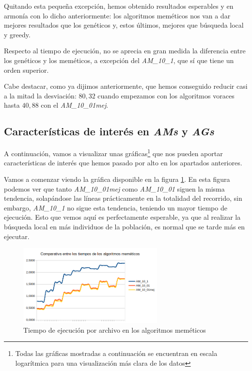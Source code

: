Quitando esta pequeña excepción, hemos obtenido resultados esperables y en armonía con lo dicho anteriormente: los algoritmos meméticos nos van a dar mejores resultados que los genéticos y, estos últimos, mejores que búsqueda local y greedy.

Respecto al tiempo de ejecución, no se aprecia en gran medida la diferencia entre los genéticos y los meméticos, a excepción del \textit{AM\_10\_1}, que sí que tiene un orden superior.

Cabe destacar, como ya dijimos anteriormente, que hemos conseguido reducir casi a la mitad la desviación: $80,32$ cuando empezamos con los algoritmos voraces hasta $40,88$ con el \textit{AM\_10\_01mej}.

\subsection{Características de interés en \textit{AMs} y \textit{AGs}}

A continuación, vamos a visualizar unas gráficas\footnote{Todas las gráficas mostradas a continuación se encuentran en escala logarítmica para una visualización más clara de los datos} que nos pueden aportar características de interés que hemos pasado por alto en los apartados anteriores.

Vamos a comenzar viendo la gráfica disponible en la figura \ref{fig:tmemeticos}. En esta figura podemos ver que tanto \textit{AM\_10\_01mej} como \textit{AM\_10\_01} siguen la misma tendencia, solapándose las líneas prácticamente en la totalidad del recorrido, sin embargo, \textit{AM\_10\_1} no sigue esta tendencia, teniendo un mayor tiempo de ejecución. Esto que vemos aquí es perfectamente esperable, ya que al realizar la búsqueda local en más individuos de la población, es normal que se tarde más en ejecutar.

\begin{figure}[H]
    \centering
	\includegraphics[width=0.65\textwidth]{data/tiempo_memeticos.png}
	\caption{Tiempo de ejecución por archivo en los algoritmos meméticos}
	\label{fig:tmemeticos}
\end{figure}


